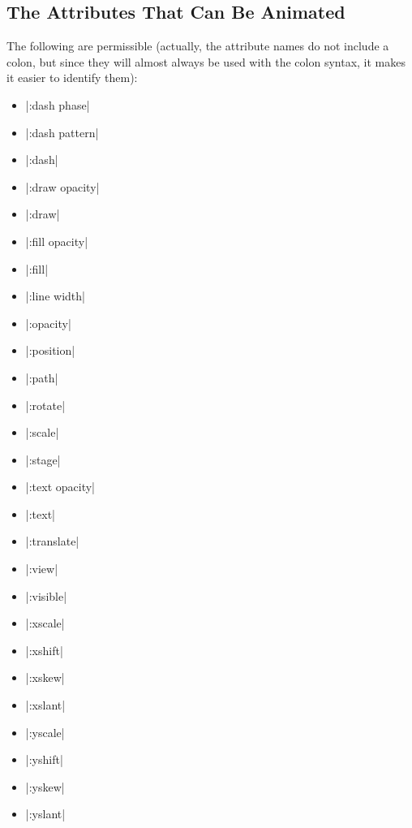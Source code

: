 \subsection{The Attributes That Can Be Animated}
\label{section-anim-attrs}

The following  are permissible (actually, the attribute names
do not include a colon, but since they will almost always be used with the
colon syntax, it makes it easier to identify them):
%
\begin{itemize}
        \itemsep0pt
    \item |:dash phase|
    \item |:dash pattern|
    \item |:dash|
    \item |:draw opacity|
    \item |:draw|
    \item |:fill opacity|
    \item |:fill|
    \item |:line width|
    \item |:opacity|
    \item |:position|
    \item |:path|
    \item |:rotate|
    \item |:scale|
    \item |:stage|
    \item |:text opacity|
    \item |:text|
    \item |:translate|
    \item |:view|
    \item |:visible|
    \item |:xscale|
    \item |:xshift|
    \item |:xskew|
    \item |:xslant|
    \item |:yscale|
    \item |:yshift|
    \item |:yskew|
    \item |:yslant|
\end{itemize}

